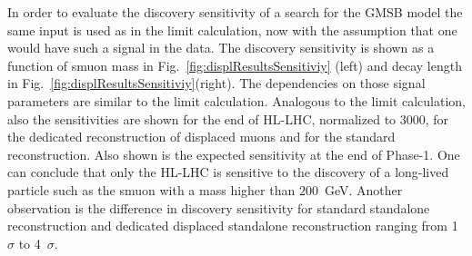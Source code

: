 In order to evaluate the discovery sensitivity of a search for the GMSB model the same input is used as in the limit calculation, now with the assumption that one would have such a signal in the data. The discovery sensitivity is shown as a function of smuon mass in Fig.~\ref{fig:displResultsSensitiviy} (left) and decay length in Fig.~\ref{fig:displResultsSensitiviy}(right). The dependencies on those signal parameters are similar to the limit calculation. Analogous to the limit calculation, also the sensitivities are shown for the end of HL-LHC, normalized to 3000\fbinv, for the dedicated reconstruction of displaced muons and for the standard reconstruction. Also shown is the expected sensitivity at the end of Phase-1. 
One can conclude that only the HL-LHC is sensitive to the discovery of a long-lived particle such as the smuon with a mass higher than $200$~GeV. Another observation is the difference in discovery sensitivity for standard standalone reconstruction and dedicated displaced standalone reconstruction ranging from 1~$\sigma$ to 4~$\sigma$.

